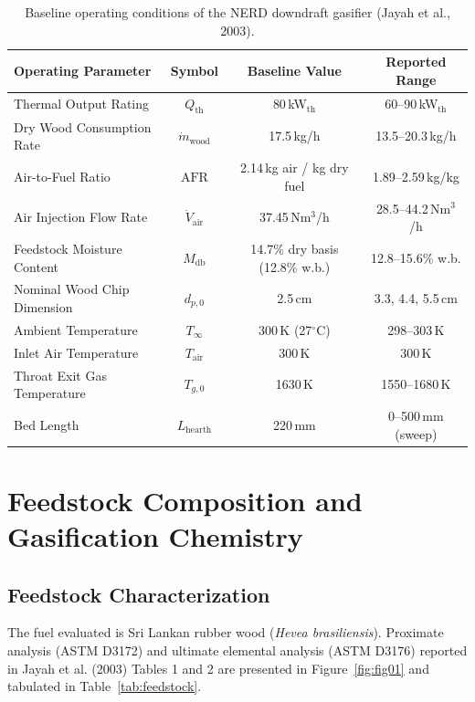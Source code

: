 \documentclass[11pt,a4paper]{article}
\begin{document}
\begin{table}[H]
    \centering
    \caption{Baseline operating conditions of the NERD downdraft gasifier (Jayah et al., 2003).}
    \label{tab:op_conditions}
    \small
    \begin{tabular}{lccc}
        \toprule
        \textbf{Operating Parameter} & \textbf{Symbol} & \textbf{Baseline Value} & \textbf{Reported Range} \\
        \midrule
        Thermal Output Rating & $Q_{\text{th}}$ & 80\,kW$_{\text{th}}$ & 60--90\,kW$_{\text{th}}$ \\
        Dry Wood Consumption Rate & $\dot{m}_{\text{wood}}$ & 17.5\,kg/h & 13.5--20.3\,kg/h \\
        Air-to-Fuel Ratio & $\text{AFR}$ & 2.14\,kg air / kg dry fuel & 1.89--2.59\,kg/kg \\
        Air Injection Flow Rate & $\dot{V}_{\text{air}}$ & 37.45\,Nm$^3$/h & 28.5--44.2\,Nm$^3$/h \\
        Feedstock Moisture Content & $M_{\text{db}}$ & 14.7\% dry basis (12.8\% w.b.) & 12.8--15.6\% w.b. \\
        Nominal Wood Chip Dimension & $d_{p,0}$ & 2.5\,cm & 3.3, 4.4, 5.5\,cm \\
        Ambient Temperature & $T_\infty$ & 300\,K (27$^\circ$C) & 298--303\,K \\
        Inlet Air Temperature & $T_{\text{air}}$ & 300\,K & 300\,K \\
        Throat Exit Gas Temperature & $T_{g,0}$ & 1630\,K & 1550--1680\,K \\
        Bed Length & $L_{\text{hearth}}$ & 220\,mm & 0--500\,mm (sweep) \\
        \bottomrule
    \end{tabular}
\end{table}

\section{Feedstock Composition and Gasification Chemistry}
\subsection{Feedstock Characterization}
The fuel evaluated is Sri Lankan rubber wood (\textit{Hevea brasiliensis}). Proximate analysis (ASTM D3172) and ultimate elemental analysis (ASTM D3176) reported in Jayah et al. (2003) Tables 1 and 2 are presented in Figure~\ref{fig:fig01} and tabulated in Table~\ref{tab:feedstock}.
\end{document}
